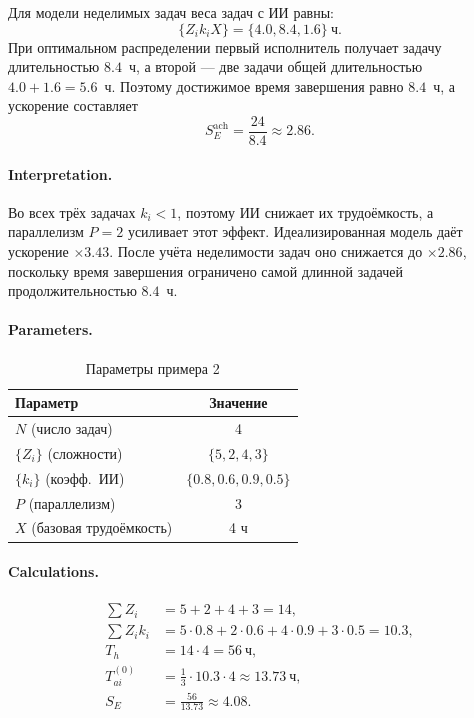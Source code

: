 \documentclass[12pt,a4paper]{article}
\theoremstyle{definition}
\begin{document}
Для модели неделимых задач веса задач с ИИ равны:
\[
  \{Z_i k_i X\} = \{4.0, 8.4, 1.6\}~\text{ч}.
\]
При оптимальном распределении первый исполнитель получает задачу длительностью $8.4$~ч, а второй --- две задачи общей длительностью $4.0 + 1.6 = 5.6$~ч. Поэтому достижимое время завершения равно $8.4$~ч, а ускорение составляет
\[
  S_E^{\text{ach}} = \frac{24}{8.4} \approx 2.86.
\]

\paragraph{Interpretation.}
Во всех трёх задачах $k_i<1$, поэтому ИИ снижает их трудоёмкость, а параллелизм $P=2$ усиливает этот эффект. Идеализированная модель даёт ускорение $\times 3.43$. После учёта неделимости задач оно снижается до $\times 2.86$, поскольку время завершения ограничено самой длинной задачей продолжительностью $8.4$~ч.


\paragraph{Parameters.}
\begin{table}[ht!]
\centering
\caption{Параметры примера 2}
\label{tab:example-2-params}
\begin{tabular}{lc}
\toprule
Параметр & Значение \\
\midrule
$N$ (число задач) & 4 \\
$\{Z_i\}$ (сложности) & $\{5, 2, 4, 3\}$ \\
$\{k_i\}$ (коэфф.\ ИИ) & $\{0.8, 0.6, 0.9, 0.5\}$ \\
$P$ (параллелизм) & 3 \\
$X$ (базовая трудоёмкость) & 4 ч \\
\bottomrule
\end{tabular}
\end{table}

\paragraph{Calculations.}
\begin{align*}
  \sum Z_i &= 5 + 2 + 4 + 3 = 14, \\
  \sum Z_i k_i &= 5{\cdot}0.8 + 2{\cdot}0.6 + 4{\cdot}0.9 + 3{\cdot}0.5 = 10.3, \\
  T_h &= 14 \cdot 4 = 56~\text{ч}, \\
  T_{ai}^{(0)} &= \frac{1}{3} \cdot 10.3 \cdot 4 \approx 13.73~\text{ч}, \\
  S_E &= \frac{56}{13.73} \approx 4.08.
\end{align*}
\end{document}

